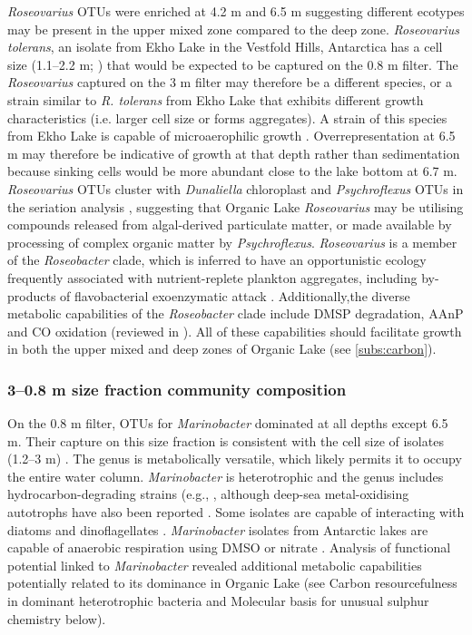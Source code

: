 \emph{Roseovarius} \acp{OTU} were enriched at 4.2 m and 6.5 m suggesting different ecotypes may be present in the upper mixed zone compared to the deep zone. 
\emph{Roseovarius tolerans}, an isolate from Ekho Lake in the Vestfold Hills, Antarctica has a cell size (1.1--2.2 \textmu{}m; \cite{Labrenz1999}) that would be expected to be captured on the 0.8 \textmu{}m filter. 
The \emph{Roseovarius} captured on the 3 \textmu{}m filter may therefore be a different species, or a strain similar to \emph{R. tolerans} from Ekho Lake that exhibits different growth characteristics (i.e. larger cell size or forms aggregates). 
A strain of this species from Ekho Lake is capable of microaerophilic growth \cite{Labrenz1999}. 
Overrepresentation at 6.5 m may therefore be indicative of growth at that depth rather than sedimentation because sinking cells would be more abundant close to the lake bottom at 6.7 m. 
\emph{Roseovarius} \acp{OTU} cluster with \emph{Dunaliella} chloroplast and \emph{Psychroflexus} \acp{OTU} in the seriation analysis , suggesting that Organic Lake \emph{Roseovarius} may be utilising compounds released from algal-derived particulate matter, or made available by processing of complex organic matter by \emph{Psychroflexus}.
\emph{Roseovarius} is a member of the \emph{Roseobacter} clade, which is inferred to have an opportunistic ecology frequently associated with nutrient-replete plankton aggregates, including by-products of flavobacterial exoenzymatic attack \cite{Moran2007a, Teeling2012}. 
Additionally,the diverse metabolic capabilities of the \emph{Roseobacter} clade include \ac{DMSP} degradation, \ac{AAnP} and CO oxidation (reviewed in \citet{Wagner-Dobler2006}). 
All of these capabilities should facilitate growth in both the upper mixed and deep zones of Organic Lake (see \ref{subs:carbon}).

\subsubsection{3--0.8 \textmu{}m size fraction community composition}
On the 0.8 \textmu{}m filter, \acp{OTU} for \emph{Marinobacter} dominated at all depths except 6.5 m. 
Their capture on this size fraction is consistent with the cell size of isolates (1.2--3 \textmu{}m) \cite{Gauthier1992}. 
The genus is metabolically versatile, which likely permits it to occupy the entire water column. 
\emph{Marinobacter} is heterotrophic and the genus includes hydrocarbon-degrading strains (e.g., \citet{Gauthier1992, Huu1999}, although deep-sea metal-oxidising autotrophs have also been reported \cite{Edwards2003}. 
Some isolates are capable of interacting with diatoms \cite{Gardes2010} and dinoflagellates \cite{Green2006}. 
\emph{Marinobacter} isolates from Antarctic lakes are capable of anaerobic respiration using \ac{DMSO} \cite{Matsuzaki2006} or nitrate \cite{Ward1997}. 
Analysis of functional potential linked to \emph{Marinobacter} revealed additional metabolic capabilities potentially related to its dominance in Organic Lake 
(see Carbon resourcefulness in dominant heterotrophic bacteria and Molecular basis for unusual sulphur chemistry below).%

